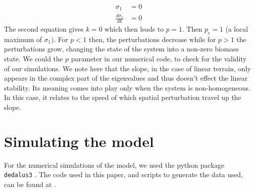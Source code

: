 \documentclass{article}
\numberwithin{equation}{section}
\begin{document}
\begin{align}
    \sigma_1 &= 0 \\
    \frac{d\sigma_1}{dk} &=  0
\end{align}
The second equation gives $k=0$ which then leads to $p=1$. Then $p_c=1$ (a local maximum of $\sigma_1)$. For $p<1$ then, the perturbations decrease while for $p>1$ the perturbations grow, changing the state of the system into a non-zero biomass state. We could the $p$ parameter in our numerical code, to check for the validity of our simulations.
We note here that the slope, in the case of linear terrain, only appears in the complex part of the eigenvalues and thus doesn't effect the linear stability. Its meaning comes into play only when the system is non-homogeneous. In this case, it relates to the speed of which spatial perturbation travel up the slope.
\section{Simulating the model}

For the numerical simulations of the model, we used the python package \texttt{dedalus3} \parencite[]{2020PhRvR...2b3068B}. The code used in this paper, and scripts to generate the data used, can be found at \cite{Ohad_Relation_Between_Biomass_2023}.
\end{document}
